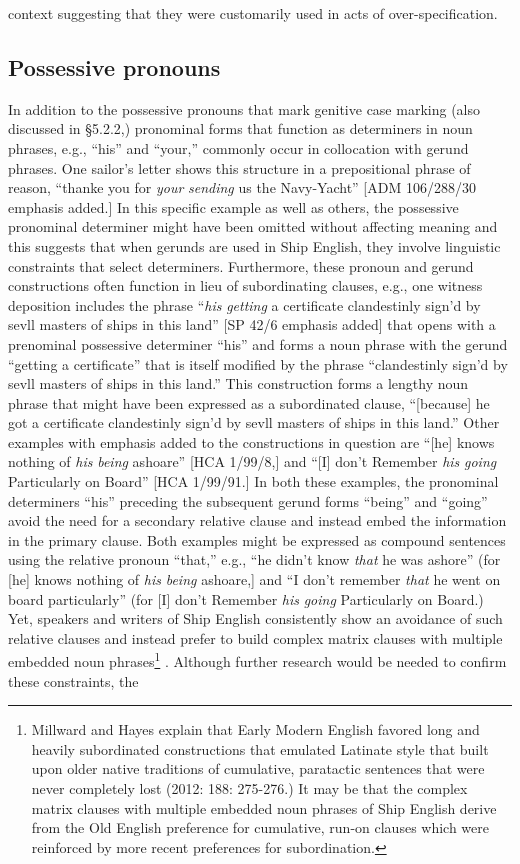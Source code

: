 context suggesting that they were customarily used in acts of over-specification.  

\subsection{\textbf{Possessive} \textbf{pronouns}}%

  In addition to the possessive pronouns that mark genitive case marking (also discussed in §5.2.2,) pronominal forms that function as determiners in noun phrases, e.g., “his” and “your,” commonly occur in collocation with gerund phrases. One sailor’s letter shows this structure in a prepositional phrase of reason, “thanke you for \textit{your} \textit{sending} us the Navy-Yacht” [ADM 106/288/30 emphasis added.] In this specific example as well as others, the possessive pronominal determiner might have been omitted without affecting meaning and this suggests that when gerunds are used in Ship English, they involve linguistic constraints that select determiners. Furthermore, these pronoun and gerund constructions often function in lieu of subordinating clauses, e.g., one witness deposition includes the phrase “\textit{his} \textit{getting} a certificate clandestinly sign'd by sevll masters of ships in this land” [SP 42/6 emphasis added] that opens with a prenominal possessive determiner “his” and forms a noun phrase with the gerund “getting a certificate” that is itself modified by the phrase “clandestinly sign'd by sevll masters of ships in this land.” This construction forms a lengthy noun phrase that might have been expressed as a subordinated clause, “[because] he got a certificate clandestinly sign'd by sevll masters of ships in this land.” Other examples with emphasis added to the constructions in question are “[he] knows nothing of \textit{his} \textit{being} ashoare” [HCA 1/99/8,] and “[I] don’t Remember \textit{his} \textit{going} Particularly on Board” [HCA 1/99/91.] In both these examples, the pronominal determiners “his” preceding the subsequent gerund forms “being” and “going” avoid the need for a secondary relative clause and instead embed the information in the primary clause. Both examples might be expressed as compound sentences using the relative pronoun “that,” e.g., “he didn’t know \textit{that} he was ashore” (for [he] knows nothing of \textit{his} \textit{being} ashoare,] and “I don’t remember \textit{that} he went on board particularly” (for [I] don’t Remember \textit{his} \textit{going} Particularly on Board.) Yet, speakers and writers of Ship English consistently show an avoidance of such relative clauses and instead prefer to build complex matrix clauses with multiple embedded noun phrases\footnote{Millward and Hayes explain that Early Modern English favored long and heavily subordinated constructions that emulated Latinate style that built upon older native traditions of cumulative, paratactic sentences that were never completely lost (2012: 188: 275-276.) It may be that the complex matrix clauses with multiple embedded noun phrases of Ship English derive from the Old English preference for cumulative, run-on clauses which were reinforced by more recent preferences for subordination.} . Although further research would be needed to confirm these constraints, the 